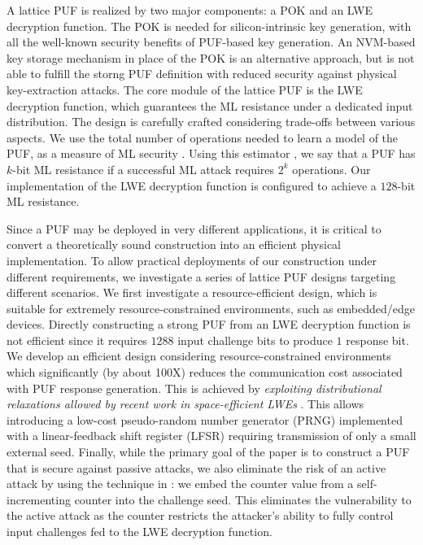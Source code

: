 A lattice PUF is realized by two major components: a POK and an LWE decryption function. 
The POK is needed for silicon-intrinsic key generation, with all the well-known security benefits of PUF-based key generation. 
An NVM-based key storage mechanism in place of the POK is an alternative approach, but is not able to fulfill the storng PUF definition with reduced security against physical key-extraction attacks.
The core module of the lattice PUF is the LWE decryption function, which guarantees the ML resistance under a dedicated input distribution. 
The design is carefully crafted considering trade-offs between various aspects.
We use the total number of operations needed to learn a model of the PUF, as a measure of ML security \cite{lindner2011better, micciancio2009lattice, albrecht2015concrete}. 
Using this estimator \cite{albrecht2015concrete}, we say that a PUF has $k$-bit ML resistance if a successful ML attack requires $2^k$ operations. 
Our implementation of the LWE decryption function is configured to achieve a $128$-bit ML resistance.

Since a PUF may be deployed in very different applications, it is critical to convert a theoretically sound construction into an efficient physical implementation. 
To allow practical deployments of our construction under different requirements, we investigate a series of lattice PUF designs targeting different scenarios. 
We first investigate a resource-efficient design, which is suitable for extremely resource-constrained environments, such as embedded/edge devices. 
Directly constructing a strong PUF from an LWE decryption function is not efficient since it requires $1288$ input challenge bits to produce $1$ response bit.
We develop an efficient design considering resource-constrained environments which significantly (by about 100X) reduces the communication cost associated with PUF response generation.
This is achieved by \emph{exploiting distributional relaxations allowed by recent work in space-efficient LWEs} \cite{galbraith2013space}.
This allows introducing a low-cost pseudo-random number generator (PRNG) implemented with a linear-feedback shift register (LFSR) requiring transmission of only a small external seed. 
Finally, while the primary goal of the paper is to construct a PUF that is secure against passive attacks, we also eliminate the risk of an active attack by using the technique in \cite{yu2016lockdown}: we embed the counter value from a self-incrementing counter into the challenge seed.
This eliminates the vulnerability to the active attack as the counter restricts the attacker's ability to fully control input challenges fed to the LWE decryption function.

